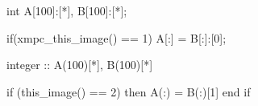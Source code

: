 \begin{minipage}{0.45\hsize}
\begin{center}
\begin{XCexample}
int A[100]:[*], B[100]:[*];

if(xmpc_this_image() == 1){
  A[:] = B[:]:[0];
}
\end{XCexample}
\end{center}
\end{minipage}
\begin{minipage}{0.45\hsize}
\begin{center}
\begin{XFexampleR}
integer :: A(100)[*], B(100)[*]

if (this_image() == 2) then
  A(:) = B(:)[1]
end if
\end{XFexampleR}
\end{center}
\end{minipage}

